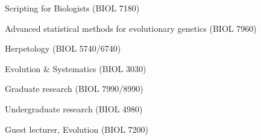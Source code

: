 \begin{veryTightItemize}
    \item Scripting for Biologists (BIOL 7180)%
    \item Advanced statistical methods for evolutionary genetics (BIOL 7960)%
    \item Herpetology (BIOL 5740/6740)%
    \item Evolution \& Systematics (BIOL 3030)%
    \item Graduate research (BIOL 7990/8990)%
    \item Undergraduate research (BIOL 4980)%
    \item Guest lecturer, Evolution (BIOL 7200)%
\end{veryTightItemize}
